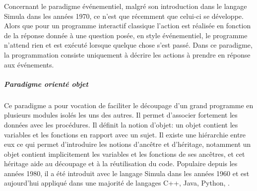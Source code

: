                 Concernant le paradigme événementiel, malgré son introduction dans le langage Simula dans les années 1970, ce n'est que récemment  que celui-ci se développe. Alors que pour un programme interactif classique l'action est réalisée en fonction de la réponse donnée à une question posée, en style événementiel, le programme n'attend rien et est exécuté lorsque quelque chose  s'est passé. Dans ce paradigme, la programmation consiste uniquement à décrire les actions à prendre en réponse aux événements.
            \subparagraph{Paradigme orienté objet}
                Ce paradigme a pour vocation de faciliter le découpage d'un grand programme en plusieurs modules isolés les uns des autres. Il permet d'associer fortement les données avec les procédures.
                Il définit la notion d'objet: un objet contient les variables et les fonctions en rapport avec un sujet. Il existe une hiérarchie entre eux ce qui permet d'introduire les notions d'ancêtre et d'héritage, notamment un objet contient implicitement les variables et les fonctions de ses ancêtres, et cet héritage aide au découpage et à la réutilisation du code. Populaire depuis les années 1980, il a été introduit avec le langage Simula dans les années 1960 et est aujourd'hui appliqué dans une majorité de langages \eg C++, Java, Python, \etc.
    \begin{comment}%
    \subsection{Théorèmes mathématiques \& Principe de physique}\label{sec:link-concept}
        \paragraph{logique formel}
        \paragraph{TAL}\sht{TAL}
        \paragraph{Probabilité}
        \paragraph{électronique, mécatronique}
        \paragraph{déplacement dans l'espace}
        \end{comment}

